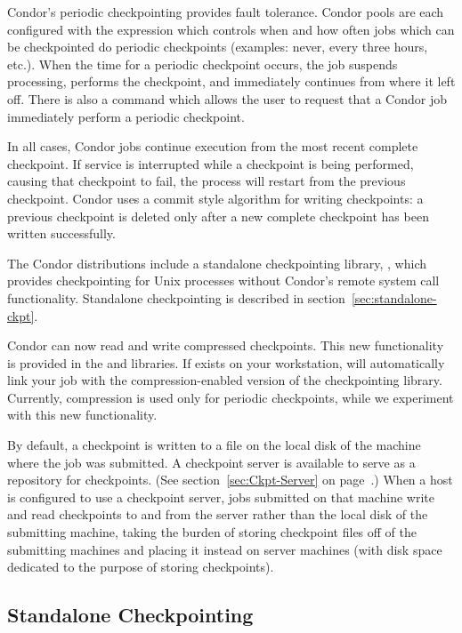Condor's periodic checkpointing provides fault tolerance.  Condor
pools are each configured with the 
expression which controls when and how often jobs which can be
checkpointed do periodic checkpoints (examples: never, every three
hours, etc.).  When the time for a periodic checkpoint occurs, the job
suspends processing, performs the checkpoint, and immediately
continues from where it left off.  There is also a  command
which allows the user to request that a Condor job immediately perform
a periodic checkpoint.

In all cases, Condor jobs continue execution from the most recent
complete checkpoint.  If service is interrupted while a checkpoint is
being performed, causing that checkpoint to fail, the process will
restart from the previous checkpoint.  Condor uses a commit style
algorithm for writing checkpoints: a previous checkpoint is deleted
only after a new complete checkpoint has been written successfully.

The Condor distributions include a standalone checkpointing library,
, which provides checkpointing for Unix processes
without Condor's remote system call functionality.  Standalone
checkpointing is described in section~\ref{sec:standalone-ckpt}.

Condor can now read and write compressed checkpoints.  This new
functionality is provided in the  and
 libraries.  If  exists on your
workstation,  will automatically link your job with
the compression-enabled version of the checkpointing library.
Currently, compression is used only for periodic checkpoints, while we
experiment with this new functionality.

By default, a checkpoint is written to a file on the local disk of the
machine where the job was submitted.  A checkpoint server is available
to serve as a repository for checkpoints.  (See
section~\ref{sec:Ckpt-Server} on page~\pageref{sec:Ckpt-Server}.)
When a host is configured to use a checkpoint server, jobs submitted
on that machine write and read checkpoints to and from the server
rather than the local disk of the submitting machine, taking the
burden of storing checkpoint files off of the submitting machines and
placing it instead on server machines (with disk space dedicated to
the purpose of storing checkpoints).

\subsection{\label{sec:standalone-ckpt}Standalone Checkpointing}

